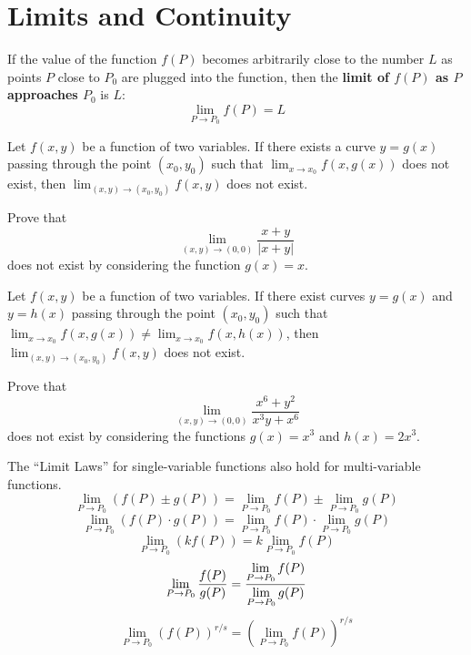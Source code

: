 \documentclass[letterpaper, twoside, 12pt]{book}
\begin{document}
\section{Limits and Continuity} %

\begin{definition}
  If the value of the function $f(P)$ becomes arbitrarily close to the number
  $L$ as points $P$ close to $P_0$ are plugged into the function, then the
  \textbf{limit of $f(P)$ as $P$ approaches $P_0$} is $L$:
  \[\lim_{P\to P_0} f(P) = L\]
\end{definition}

\begin{theorem}
  Let $f(x,y)$ be a function of two variables.
  If there exists a curve $y=g(x)$ passing through the
  point $(x_0,y_0)$ such that $\lim_{x\to x_0}f(x,g(x))$ does not exist,
  then $\lim_{(x,y)\to(x_0,y_0)}f(x,y)$ does not exist.
\end{theorem}

          \begin{problem}
            Prove that
              \[
                \lim_{(x,y)\to(0,0)} \frac{x+y}{|x+y|}
              \]
            does not exist by considering the function $g(x)=x$.
          \end{problem}

          \begin{solution}

          \end{solution}

\begin{theorem}
  Let $f(x,y)$ be a function of two variables.
  If there exist curves $y=g(x)$ and $y=h(x)$ passing through the
  point $(x_0,y_0)$ such that
  $\lim_{x\to x_0}f(x,g(x))\not=\lim_{x\to x_0}f(x,h(x))$,
  then $\lim_{(x,y)\to(x_0,y_0)}f(x,y)$ does not exist.
\end{theorem}

          \begin{problem}
            Prove that
              \[
                \lim_{(x,y)\to(0,0)} \frac{x^6+y^2}{x^3y+x^6}
              \]
            does not exist by considering the functions
            $g(x)=x^3$ and $h(x)=2x^3$.
          \end{problem}

          \begin{solution}

          \end{solution}

\begin{theorem}
  The ``Limit Laws'' for single-variable functions also hold for
  multi-variable functions.
    \[
      \lim_{P\to P_0}(f(P)\pm g(P))
        =
      \lim_{P\to P_0}f(P) \pm \lim_{P\to P_0}g(P)
    \]
    \[
      \lim_{P\to P_0}(f(P)\cdot g(P))
        =
      \lim_{P\to P_0}f(P) \cdot \lim_{P\to P_0}g(P)
    \]
    \[
      \lim_{P\to P_0}(kf(P))
        =
      k\lim_{P\to P_0}f(P)
    \]
    \[
      \lim_{P\to P_0}\frac{f(P)}{g(P)}
        =
      \frac{\displaystyle \lim_{P\to P_0}f(P)}{\displaystyle \lim_{P\to P_0}g(P)}
    \]
    \[
      \lim_{P\to P_0}(f(P))^{r/s}
        =
      \left(\lim_{P\to P_0}f(P)\right)^{r/s}
    \]
\end{theorem}
\end{document}
